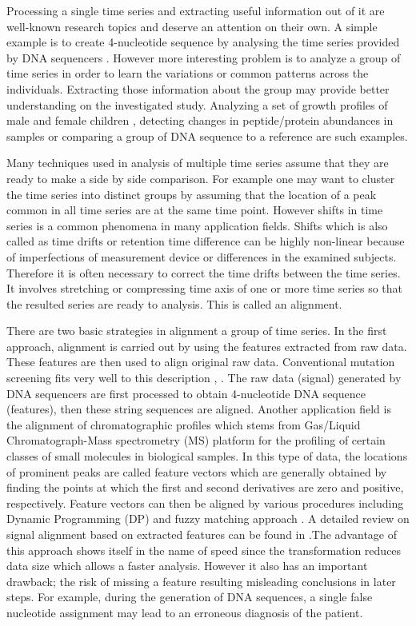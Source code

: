 \documentclass[number,1p,12pt]{elsarticle}
\begin{document}
Processing a single time series and extracting useful information out of it are well-known research topics and deserve an attention on their own. A simple example is to create 4-nucleotide sequence by analysing the time series provided by DNA sequencers \cite{Ewing1998}. However more interesting problem is to analyze a group of time series in order to learn the variations or common patterns across the individuals. Extracting those information about the group may provide better understanding on the investigated study.  Analyzing a set of growth profiles of male and female children \cite{Thalange1996}, detecting changes in peptide/protein abundances in samples \cite{Akella2009} or comparing a group of DNA sequence to a reference \cite{Bonfield1998} are such examples. 

Many techniques used in analysis of multiple time series assume that they are ready to make a side by side comparison. For example one may want to cluster the time series into distinct groups by assuming that the location of a peak common in all time series are at the same time point. However shifts in time series is a common phenomena in many application fields. Shifts which is also called as time drifts or retention time difference can be highly non-linear because of imperfections of measurement device or differences in the  examined subjects. Therefore it is often necessary to correct the time drifts between the time series. It involves stretching or compressing time axis of one or more time series so that the resulted series are ready to analysis. This is called an alignment.

There are two basic strategies in alignment a group of time series. In the first approach, alignment is carried out by using the features extracted from raw data. These features are then used to align original raw data.  
Conventional mutation screening fits very well to this description \cite{Mott1998}, \cite{Nickerson1997}. The raw data (signal) generated by DNA sequencers are first processed to obtain 4-nucleotide DNA sequence (features), then these  string sequences are aligned. Another application field is the alignment of chromatographic profiles which stems from Gas/Liquid Chromatograph-Mass spectrometry (MS) platform for the profiling of certain classes of small molecules in biological samples. In this type of data, the locations of prominent peaks are called feature vectors which are generally obtained by finding the points at which the first and second derivatives are zero and positive, respectively. Feature vectors can then be aligned by various procedures including Dynamic Programming (DP) \cite{Robinson2007} and fuzzy matching approach \cite{Walczak2005}. A detailed review on signal alignment based on extracted features can be found in \cite{Aberg2009}.The advantage of this approach shows itself in the name of speed since the transformation reduces data size which allows a faster analysis. However it also has an important drawback; the risk of missing a feature resulting misleading conclusions in later steps. For example, during the generation of DNA sequences, a single false nucleotide assignment may lead to an erroneous diagnosis of the patient. 
\end{document}
